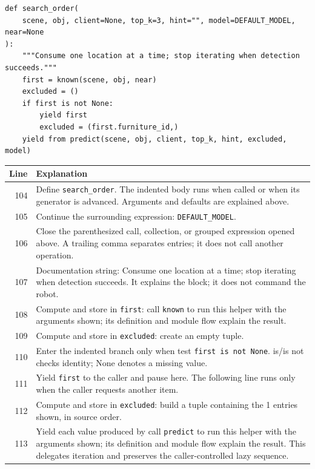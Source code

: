 \documentclass[11pt,a4paper]{book}
\begin{document}
\begin{lstlisting}[firstnumber=104]
def search_order(
    scene, obj, client=None, top_k=3, hint="", model=DEFAULT_MODEL, near=None
):
    """Consume one location at a time; stop iterating when detection succeeds."""
    first = known(scene, obj, near)
    excluded = ()
    if first is not None:
        yield first
        excluded = (first.furniture_id,)
    yield from predict(scene, obj, client, top_k, hint, excluded, model)
\end{lstlisting}

\begin{longtable}{r p{}}

\textbf{Line} & \textbf{Explanation} \\ \hline \endhead

104 & Define \texttt{search\_order}. The indented body runs when called or when its generator is advanced. Arguments and defaults are explained above. \\

105 & Continue the surrounding expression: \texttt{DEFAULT\_MODEL}. \\

106 & Close the parenthesized call, collection, or grouped expression opened above. A trailing comma separates entries; it does not call another operation. \\

107 & Documentation string: Consume one location at a time; stop iterating when detection succeeds. It explains the block; it does not command the robot. \\

108 & Compute and store in \texttt{first}: call \texttt{known} to run this helper with the arguments shown; its definition and module flow explain the result.  \\

109 & Compute and store in \texttt{excluded}: create an empty tuple.  \\

110 & Enter the indented branch only when test \texttt{first is not None}. is/is not checks identity; None denotes a missing value. \\

111 & Yield \texttt{first} to the caller and pause here. The following line runs only when the caller requests another item. \\

112 & Compute and store in \texttt{excluded}: build a tuple containing the 1 entries shown, in source order.  \\

113 & Yield each value produced by call \texttt{predict} to run this helper with the arguments shown; its definition and module flow explain the result. This delegates iteration and preserves the caller-controlled lazy sequence. \\

\end{longtable}
\end{document}
